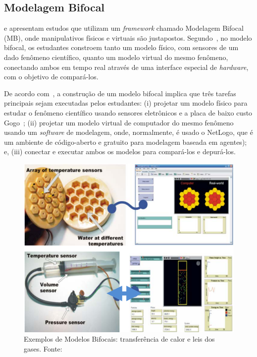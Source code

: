 \subsection{Modelagem Bifocal}

\cite{Blikstein:2012} e \cite{Blikstein2016} apresentam estudos que utilizam um \textit{framework} chamado Modelagem Bifocal (MB), onde manipulativos físicos e virtuais são justapostos. Segundo~\cite{Blikstein:2012}, no modelo bifocal, os estudantes constroem tanto um modelo físico, com sensores de um dado fenômeno científico, quanto um modelo virtual do mesmo fenômeno, conectando ambos em tempo real através de uma interface especial de \textit{hardware}, com o objetivo de compará-los.

De acordo com~\cite{Blikstein:2012}, a construção de um modelo bifocal implica que três tarefas principais sejam executadas pelos estudantes: (i) projetar um modelo físico para estudar o fenômeno científico usando sensores eletrônicos e a placa de baixo custo Gogo~\citep{sipitakiat:2003}; (ii) projetar um modelo virtual de computador do mesmo fenômeno usando um \textit{software} de modelagem, onde, normalmente, é usado o NetLogo, que é um ambiente de código-aberto e gratuito para modelagem baseada em agentes); e, (iii) conectar e executar ambos os modelos para compará-los e depurá-los.

\begin{figure}[htb]
	\centering
	\includegraphics[width=0.8\linewidth]{chapters/works/blikstein2012.png}
	\captionsetup{justification=centering}
	\caption{Exemplos de Modelos Bifocais: transferência de calor e leis dos gases. Fonte:~\cite{Blikstein:2012}}
	\label{fig:blikstein2012}
\end{figure}

